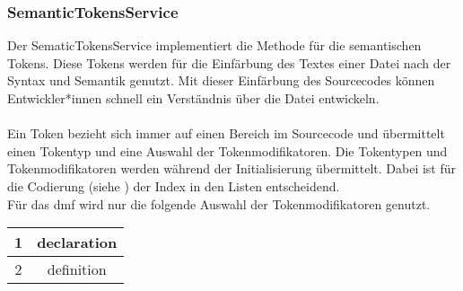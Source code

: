 \documentclass[./einleitung.tex]{subfiles}
\begin{document}
    \subsubsection{SemanticTokensService }\label{subsubsec:semantic-service}
    Der SematicTokensService implementiert die Methode für die semantischen Tokens.
    Diese Tokens werden für die Einfärbung des Textes einer Datei nach der Syntax und Semantik genutzt.
    Mit dieser Einfärbung des Sourcecodes können Entwickler*innen schnell ein Verständnis über die Datei entwickeln.
    \\\\
    Ein Token bezieht sich immer auf einen Bereich im Sourcecode und übermittelt einen Tokentyp und eine Auswahl der Tokenmodifikatoren.
    Die Tokentypen und Tokenmodifikatoren werden während der Initialisierung übermittelt.
    Dabei ist für die Codierung (siehe ) der Index in den Listen entscheidend. \\
    Für das \acrshort{dmf} wird nur die folgende Auswahl der Tokenmodifikatoren genutzt.
    \begin{center}
        \begin{tabular}{|c|c|}
            1 & declaration \\
            \hline
            2 & definition
        \end{tabular}
    \end{center}
\end{document}

